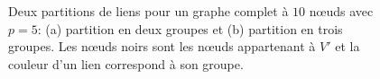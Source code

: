 \begin{figure}
\centering
	\hspace{2cm}
	\caption{Deux partitions de liens pour un graphe complet à $10$ n\oe uds avec $p=5$: (a) partition en deux groupes et (b) partition en trois groupes.
	Les n\oe uds noirs sont les n\oe uds appartenant à $V'$ et la couleur d'un lien correspond à son groupe.}
	\label{fig:1C}
\end{figure}

